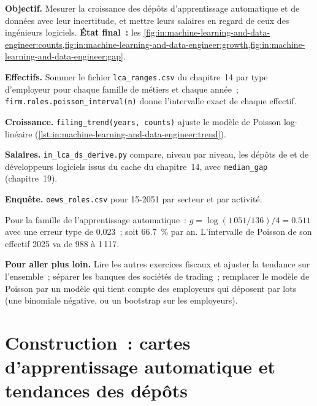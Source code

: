 \begin{tutorial}
\textbf{Objectif.} Mesurer la croissance des dépôts d'apprentissage automatique et de données avec leur incertitude, et mettre leurs salaires en regard
de ceux des ingénieurs logiciels.
\textbf{État final~:} les \cref{fig:in:machine-learning-and-data-engineer:counts,fig:in:machine-learning-and-data-engineer:growth,fig:in:machine-learning-and-data-engineer:gap}.
\begin{tutsteps}
\item \textbf{Effectifs.} Sommer le fichier \texttt{lca\_ranges.csv} du chapitre~14 par type d'employeur pour chaque famille de métiers et chaque année~;
\texttt{firm.roles.poisson\_interval(n)} donne l'intervalle exact de chaque effectif.
\item \textbf{Croissance.} \texttt{filing\_trend(years, counts)} ajuste le modèle de Poisson log-linéaire
(\cref{lst:in:machine-learning-and-data-engineer:trend}).
\label{lst:in:machine-learning-and-data-engineer:trend}
\item \textbf{Salaires.} \texttt{in\_lca\_ds\_derive.py} compare, niveau par niveau, les dépôts de  et de développeurs logiciels
issus du cache du chapitre~14, avec \texttt{median\_gap} (chapitre~19).
\item \textbf{Enquête.} \texttt{oews\_roles.csv} pour 15-2051 par secteur et par activité.
\end{tutsteps}
\end{tutorial}

Pour la famille de l'apprentissage automatique~: $g=\log(1\,051/136)/4=0.511$ avec une erreur type de 0.023~; soit 66.7~\% par an. L'intervalle de Poisson de son effectif
2025 va de 988 à 1\,117.

\textbf{Pour aller plus loin.} Lire les autres exercices fiscaux et ajuster la tendance sur l'ensemble~; séparer les banques des sociétés de trading~;
remplacer le modèle de Poisson par un modèle qui tient compte des employeurs qui déposent par lots (une binomiale négative, ou un bootstrap
sur les employeurs).

\section{Construction~: cartes d'apprentissage automatique et tendances des dépôts}\label{bld:in:machine-learning-and-data-engineer:roles}


